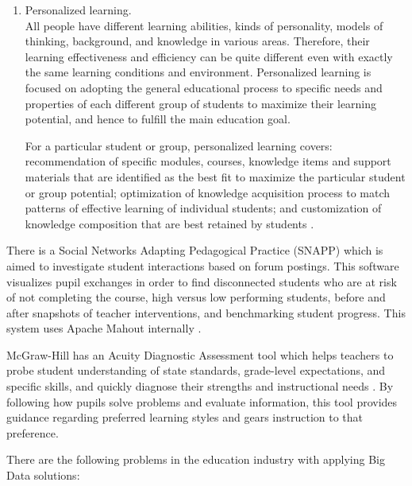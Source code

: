 \documentclass[runningheads]{llncs}
\begin{document}
\begin{enumerate}
\item Personalized learning.\\

All people have different learning abilities, kinds of personality, models of thinking, background, and knowledge in various areas. Therefore, their learning effectiveness and efficiency can be quite different even with exactly the same learning conditions and environment. Personalized learning is focused on adopting the general educational process to specific needs and properties of each different group of students to maximize their learning potential, and hence to fulfill the main education goal. 

For a particular student or group, personalized learning covers: recommendation of specific modules, courses, knowledge items and support materials that are identified as the best fit to maximize the particular student or group potential; optimization of knowledge acquisition process to match patterns of effective learning of individual
students; and customization of knowledge composition that are best retained by students \cite{EDUCATIONOPPORTUNITIES}.

\end{enumerate}

There is a Social Networks Adapting Pedagogical Practice (SNAPP) which is aimed to investigate student interactions based on forum postings. This software visualizes pupil exchanges in order to find disconnected students who are at risk of not completing the course, high versus low performing students, before and after snapshots of teacher interventions, and benchmarking student progress. This system uses Apache Mahout internally \cite{EDREPORT}. 

McGraw-Hill has an Acuity Diagnostic Assessment tool which helps teachers to probe student understanding of state standards, grade-level expectations, and specific skills, and quickly diagnose their strengths and instructional needs \cite{MCGRAW}. By following how pupils solve problems and evaluate information, this tool provides guidance regarding preferred learning styles and gears instruction to that preference. 

There are the following problems in the education industry with applying Big Data solutions:
\end{document}
